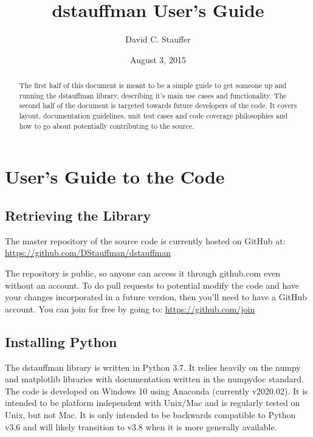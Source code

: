\documentclass[12pt]{article}
\begin{document}
\title{dstauffman User's Guide}
\author{David C. Stauffer}
\date{August 3, 2015}
\maketitle

\begin{abstract}\label{Abstract}
The first half of this document is meant to be a simple guide to get someone up and running the dstauffman library, describing it's main use cases and functionality.  The second half of the document is targeted towards future developers of the code.  It covers layout, documentation guidelines, unit test cases and code coverage philosophies and how to go about potentially contributing to the source.
\end{abstract}

\begin{versionhistory}
\end{versionhistory}

\pagebreak
\tableofcontents
{}

\pagebreak
\listoffigures
{}
\listoftables
{}

\pagebreak
\section{User's Guide to the Code}\label{h1:Users_guide}
\subsection{Retrieving the Library}\label{h2:Retrieving_the_library}
The master repository of the source code is currently hosted on GitHub at:
\newline\url{https://github.com/DStauffman/dstauffman}

The repository is public, so anyone can access it through github.com even without an account.  To do pull requests to potential modify the code and have your changes incorporated in a future version, then you'll need to have a GitHub account.  You can join for free by going to:
\newline\url{https://github.com/join}

\subsection{Installing Python}\label{h2:Installing Python}
The dstauffman library is written in Python 3.7.  It relies heavily on the numpy and matplotlib libraries with documentation written in the numpydoc standard.  The code is developed on Windows 10 using Anaconda (currently v2020.02).  It is intended to be platform independent with Unix/Mac and is regularly tested on Unix, but not Mac.  It is only intended to be backwards compatible to Python v3.6 and will likely transition to v3.8 when it is more generally available.
\end{document}
